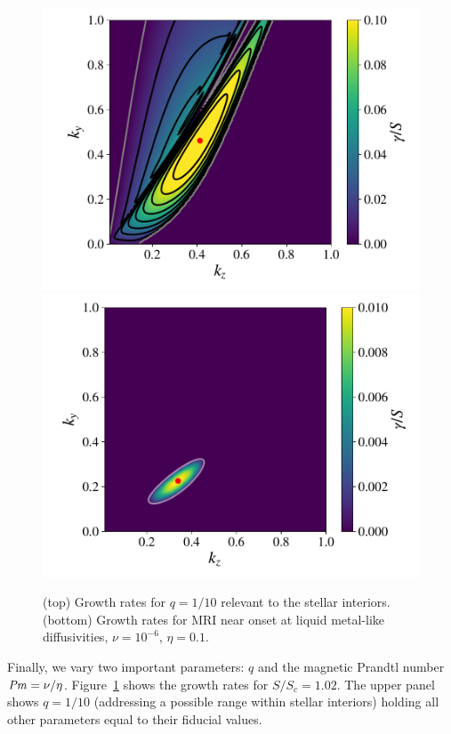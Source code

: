 \documentclass[aps,prl,reprint,superscriptaddress]{revtex4-1}
\newcommand{\SSC}{S/S_{c}}
\newcommand{\Prm}{\mbox{\textit{Pm}}}
\begin{document}
\begin{figure}[h!]
  \centering
  \includegraphics[width=\columnwidth]{run_47_output_growthrates.pdf}\\
  \includegraphics[width=\columnwidth]{run_49_output_growthrates.pdf}
  \caption{(top) Growth rates for $q=1/10$ relevant to the stellar interiors. 
  (bottom) Growth rates for MRI near onset at liquid metal-like diffusivities, $\nu=10^{-6}$, $\eta=0.1$.}
  \label{fig:other_params}
\end{figure}
Finally, we vary two important parameters:
$q$ and the magnetic Prandtl number $\Prm=\nu/\eta$.
Figure~\ref{fig:other_params} shows the growth rates for $\SSC=1.02$.
The upper panel shows $q=1/10$ (addressing a possible range within stellar interiors) holding all other parameters equal to their fiducial values.
\end{document}
